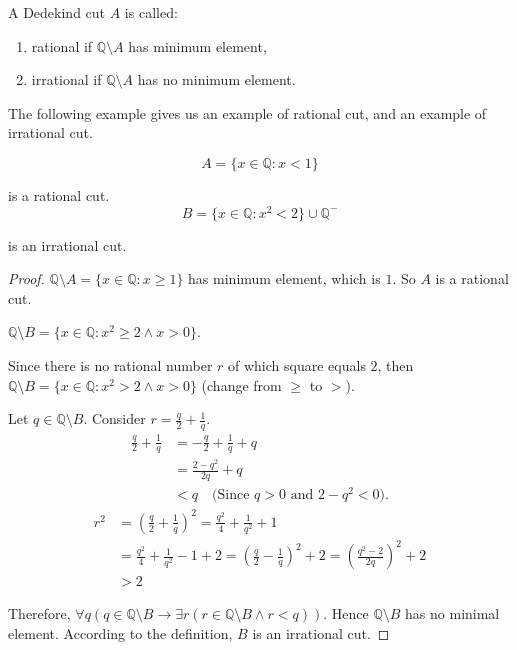 \begin{definition}
    A Dedekind cut $ A$ is called:
    \begin{enumerate}[label = (\roman*)]
        \item rational if $\mathbb{Q}\setminus A$ has minimum element,
        \item irrational if $\mathbb{Q}\setminus A$ has no minimum element.
    \end{enumerate}
\end{definition}

\par The following example gives us an example of rational cut, and an example of irrational cut.

\begin{example}
    \[
        A = \{ x\in\mathbb{Q}: x < 1 \}
    \]
    \par is a rational cut.
    \[
        B = \{ x\in\mathbb{Q}: {x}^{2} < 2 \} \cup \mathbb{Q}^{-}
    \]
    \par is an irrational cut.
\end{example}

\begin{proof}
    \par $\mathbb{Q}\setminus A = \{ x\in\mathbb{Q}: x\ge 1 \}$ has minimum element, which is $1$. So $ A$ is a rational cut.
    \bigskip
    \par $\mathbb{Q}\setminus B = \{ x\in\mathbb{Q}: {x}^{2}\ge 2 \wedge x > 0 \}$.
    \par Since there is no rational number $r$ of which square equals $2$, then $\mathbb{Q}\setminus B = \{ x\in\mathbb{Q}: {x}^{2} > 2 \wedge x > 0 \}$ (change from $\ge$ to $>$).
    \par Let $q\in\mathbb{Q}\setminus B$. Consider $r = \frac{q}{2} + \frac{1}{q}$.
    \begin{align*}
        \frac{q}{2} + \frac{1}{q} & = -\frac{q}{2} + \frac{1}{q} + q                       \\
                                  & = \frac{2 - {q}^{2}}{2q} + q                           \\
                                  & < q \quad\text{(Since $q > 0$ and $2 - {q}^{2} < 0$)}.
    \end{align*}
    \begin{align*}
        {r}^{2} & = {\left(\frac{q}{2} + \frac{1}{q}\right)}^{2} = \frac{q^{2}}{4} + \frac{1}{q^{2}} + 1                                                         \\
                & = \frac{q^{2}}{4} + \frac{1}{q^{2}} - 1 + 2 = {\left(\frac{q}{2} - \frac{1}{q}\right)}^{2} + 2 = {\left( \frac{q^{2} - 2}{2q} \right)}^{2} + 2 \\
                & > 2
    \end{align*}
    \par Therefore, $\forall q(q\in\mathbb{Q}\setminus B \rightarrow \exists r( r\in\mathbb{Q}\setminus B \wedge r < q ))$. Hence $\mathbb{Q}\setminus B$ has no minimal element. According to the definition, $ B$ is an irrational cut.
\end{proof}

